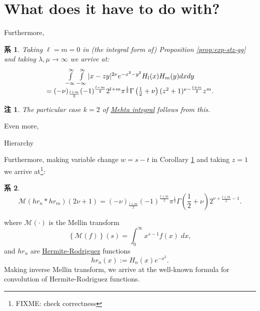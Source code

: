 \documentclass[pdf,notes]{beamer}
\newtheorem{remark}{注}
\newtheorem{cor}{系}
\begin{document}
\section{What does it have to do with?}
\begin{frame}
	Furthermore,
	\begin{cor}\label{cor:int-xzy-hh}
		Taking $\ell=m=0$ in (the integral form of) Proposition \ref{prop:exp-stz-gg} and taking $\lambda,\mu\to\infty$ we arrive at:
		\begin{equation*}
			\begin{array}[]{c}
			\int_{- \infty}^{\infty} \int_{- \infty}^{\infty} | x - z y |^{2 \nu} e^{-
			x^2 - y^2} H_l (x) H_m (y) d x d y \\= (- \nu)_{\frac{l + m}{2}} (- 1)^{\frac{l
			- m}{2}} 2^{l + m} \pi^{\frac{1}{2}} \Gamma \left( \frac{1}{2} + \nu \right)
			(z^2 + 1)^{\nu - \frac{l + m}{2}} z^m .
			\end{array}
		\end{equation*}
	\end{cor}
	\begin{remark}
		The particular case $k=2$ of \underline{Mehta integral} follows from this.
	\end{remark}
	Even more,
\end{frame}
\begin{frame}[fragile]{Hierarchy}
\begin{tikzpicture}

\end{tikzpicture}
\end{frame}
\begin{frame}
	Furthermore, making variable change $w=s-t$ in Corollary \ref{cor:int-xzy-hh} and taking $z=1$ we arrive at\footnote[frame]{FIXME: check correctness}:
	\begin{cor}
		\begin{equation}
			\mathcal{M}(hr_n\ast hr_m)(2\nu+1)=
			(- \nu)_{\frac{l + m}{2}} (- 1)^{\frac{l
			+ m}{2}}  \pi^{\frac{1}{2}} \Gamma \left( \frac{1}{2} + \nu \right)
			2^{\nu + \frac{l + m}{2}-1}.
			\label{eqn:mellin-hh}
		\end{equation}
	\end{cor}
	where $\mathcal{M}(\cdot)$ is the Mellin transform\begin{equation*}
		\left\{ \mathcal{M}(f) \right\}(s)=\int_0^\infty x^{s-1}f(x)\;dx,
	\end{equation*}
	and $hr_n$ are \underline{Hermite-Rodriguez} functions \cite{mackenzie2003hermite}
	\begin{equation*}
		hr_n(x):=H_n(x)e^{-x^2}.
	\end{equation*}
	Making inverse Mellin transform, we arrive at the well-known formula for convolution of Hermite-Rodriguez functions.
\end{frame}
\end{document}
